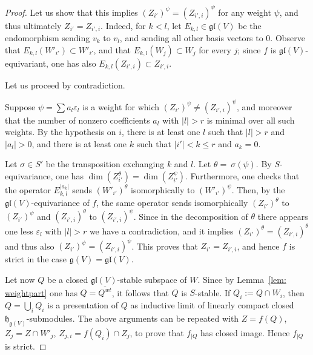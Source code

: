 \documentclass[12pt,reqno]{amsart}
\theoremstyle{definition}
\theoremstyle{remark}
\begin{document}
\begin{proof}
	Let us show that this implies $(Z_{i'})^\psi = (Z_{i', i})^\psi$ for any weight $\psi$, and thus ultimately $Z_{i'} = Z_{i', i}$. Indeed, for $k<l$, let $E_{k,l}\in\mathfrak{gl}(V)$ be the endomorphism sending $v_k$ to $v_l$, and sending all other basis vectors to $0$. Observe that $E_{k,l}(W'_{i'})\subset W'_{i'}$, and that $E_{k,l}(W_{j})\subset W_{j}$ for every $j$; since $f$ is $\mathfrak{gl}(V)$-equivariant, one has also $E_{k,l}(Z_{i', i})\subset Z_{i', i}$.
	
	Let us proceed by contradiction. 
 
 
 
 
 
 Suppose $\psi = \sum a_l \varepsilon_l$ 
 is a weight for which 
	$(Z_{i'})^\psi \neq (Z_{i', i})^\psi$,
 and moreover that the number of nonzero coefficients $a_l$ with $|l| > r$ is minimal over all such weights.
  By the hypothesis on $i$, there is at least one 
    $l$ such that  $|l|> r$ and $|a_l| > 0$, and there is at least one $k$ such that $|i'| < k \leq r$ and $a_k = 0$. 
	
	Let $\sigma\in S'$ be the transposition exchanging $k$ and $l$. Let $\theta = \ \sigma ( \psi )$. By $S$-equivariance, one has $\dim(Z_{i'}^{\theta}) = \dim(Z_{i'}^{\psi})$. Furthermore, one checks that the operator $E_{k,l}^{|a_k|}$ sends  $(W'_{i'})^{\theta}$ isomorphically to 
 $(W'_{i'})^{\psi}$. Then, by the $\mathfrak{gl}(V)$-equivariance of $f$, the same operator sends isomorphically $(Z_{i'})^{\theta}$ to $(Z_{i'})^{\psi}$ and $(Z_{i', i})^{\theta}$ to $(Z_{i', i})^{\psi}$. Since in the decomposition of $\theta$ there appears one less $\varepsilon_l$ with $|l|>r$ we have a contradiction, and it implies $(Z_{i'})^{\theta}=(Z_{i', i})^{\theta}$ and thus also $(Z_{i'})^{\psi}=(Z_{i', i})^{\psi}$. 
 This proves that $Z_{i'} = Z_{i', i}$, and hence $f$ is strict in the case $\mathfrak{g}(V) = \mathfrak{gl}(V)$.











 
Let now $Q$ be a closed $\mathfrak{gl}(V)$-stable subspace of $W$. Since by Lemma~\ref{lem: weightpart} one has $Q = \overline{Q^{wt}}$, it follows that $Q$ is $S$-stable. If $Q_i := Q\cap W_i$, then $Q=\bigcup_i Q_i$ is a presentation of $Q$ as inductive limit of linearly compact closed $\mathfrak{h}_{\mathfrak{g}(V)}$-submodules. The above arguments can be repeated with $Z=f(Q)$, $Z_j = Z\cap W'_j$, $Z_{j,i}=f(Q_i)\cap Z_j$, to prove that $f_{|Q}$ has closed image. Hence $f_{|Q}$ is strict.


\end{proof}
\end{document}
